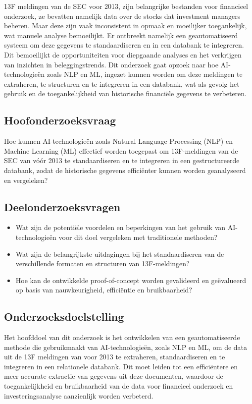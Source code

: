\documentclass{hogent-article}
\begin{document}
13F meldingen van de SEC voor 2013, zijn belangrijke bestanden voor financieel onderzoek, ze bevatten namelijk data over de stocks dat investment managers beheren. Maar deze zijn vaak inconsistent in opmaak en moeilijker toegankelijk, wat manuele analyse bemoeilijkt. Er ontbreekt namelijk een geautomatiseerd systeem om deze gegevens te standaardiseren en in een databank te integreren. Dit bemoeilijkt de opportuniteiten voor diepgaande analyses en het verkrijgen van inzichten in beleggingstrends. Dit onderzoek gaat opzoek naar hoe AI-technologieën zoals NLP en ML, ingezet kunnen worden om deze meldingen te extraheren, te structuren en te integreren in een databank, wat als gevolg het gebruik en de toegankelijkheid van historische financiële gegevens te verbeteren.

\subsection{Hoofonderzoeksvraag}

Hoe kunnen AI-technologieën zoals Natural Language Processing (NLP) en Machine Learning (ML) effectief worden toegepast om 13F-meldingen van de SEC van vóór 2013 te standaardiseren en te integreren in een gestructureerde databank, zodat de historische gegevens efficiënter kunnen worden geanalyseerd en vergeleken?

\subsection{Deelonderzoeksvragen}
\begin{itemize}
    \item Wat zijn de potentiële voordelen en beperkingen van het gebruik van AI-technologieën voor dit doel vergeleken met traditionele methoden?
    \item Wat zijn de belangrijkste uitdagingen bij het standaardiseren van de verschillende formaten en structuren van 13F-meldingen?
    \item Hoe kan de ontwikkelde proof-of-concept worden gevalideerd en geëvalueerd op basis van nauwkeurigheid, efficiëntie en bruikbaarheid?
\end{itemize}
    
    

\subsection{Onderzoeksdoelstelling}
Het hoofddoel van dit onderzoek is het ontwikkelen van een geautomatiseerde methode die gebruikmaakt van AI-technologieën, zoals NLP en ML, om de data uit de 13F meldingen van voor 2013 te extraheren, standaardiseren en te integreren in een relationele databank. Dit moet leiden tot een efficiëntere en meer accurate extractie van gegevens uit deze documenten, waardoor de toegankelijkheid en bruikbaarheid van de data voor financieel onderzoek en investeringsanalyse aanzienlijk worden verbeterd. 
\end{document}
